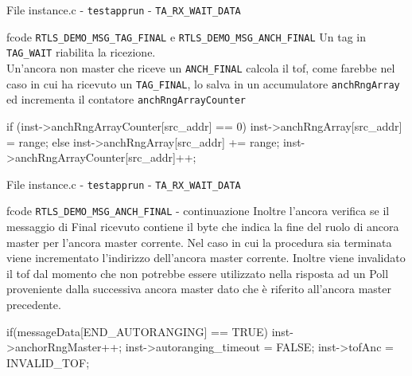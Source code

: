 \begin{frame}[fragile]{File instance.c - \lstinline[language=C]!testapprun! - \lstinline[language=C]!TA_RX_WAIT_DATA!}
  \begin{block}{fcode \lstinline[language=C]!RTLS_DEMO_MSG_TAG_FINAL! e \lstinline[language=C]!RTLS_DEMO_MSG_ANCH_FINAL!}
    Un tag in \lstinline[language=C]!TAG_WAIT! riabilita la ricezione.\\
    Un'ancora non master che riceve un \lstinline[language=C]!ANCH_FINAL! calcola il tof, come
    farebbe nel caso in cui ha ricevuto un \lstinline[language=C]!TAG_FINAL!, lo salva in un accumulatore
    \lstinline[language=C]!anchRngArray! ed incrementa il contatore \lstinline[language=C]!anchRngArrayCounter!
    \begin{C}
      if (inst->anchRngArrayCounter[src_addr] == 0)
        inst->anchRngArray[src_addr] = range;
      else 
        inst->anchRngArray[src_addr] += range;
      inst->anchRngArrayCounter[src_addr]++;
    \end{C}
  \end{block}
\end{frame}

\begin{frame}[fragile]{File instance.c - \lstinline[language=C]!testapprun! - \lstinline[language=C]!TA_RX_WAIT_DATA!}
  \begin{block}{fcode \lstinline[language=C]!RTLS_DEMO_MSG_ANCH_FINAL! - continuazione}
    Inoltre l'ancora verifica se il messaggio di Final ricevuto contiene
    il byte che indica la fine del ruolo di ancora master per l'ancora
    master corrente. Nel caso in cui la procedura sia terminata viene incrementato
    l'indirizzo dell'ancora master corrente. Inoltre \alert{viene invalidato} il tof
    dal momento che non potrebbe essere utilizzato nella risposta ad un Poll proveniente
    dalla successiva ancora master dato che è riferito all'ancora master precedente.
    \begin{C}
      if(messageData[END_AUTORANGING] == TRUE)
      {
        inst->anchorRngMaster++;
        inst->autoranging_timeout = FALSE;
        inst->tofAnc = INVALID_TOF;
      }
    \end{C}
  \end{block}
\end{frame}

